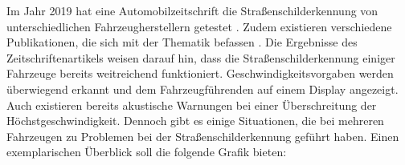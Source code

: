 Im Jahr 2019 hat eine Automobilzeitschrift die Straßenschilderkennung von unterschiedlichen Fahrzeugherstellern getestet \cite{strassenschilderkennungTest}. Zudem existieren verschiedene Publikationen, die sich mit der Thematik befassen \cite{traffic-sign-detection-review-2014}. Die Ergebnisse des Zeitschriftenartikels weisen darauf hin, dass die Straßenschilderkennung einiger Fahrzeuge bereits weitreichend funktioniert. Geschwindigkeitsvorgaben werden überwiegend erkannt und dem Fahrzeugführenden auf einem Display angezeigt. Auch existieren bereits akustische Warnungen bei einer Überschreitung der Höchstgeschwindigkeit. Dennoch gibt es einige Situationen, die bei mehreren Fahrzeugen zu Problemen bei der Straßenschilderkennung geführt haben. Einen exemplarischen Überblick soll die folgende Grafik bieten: \cite{strassenschilderkennungTest} 

